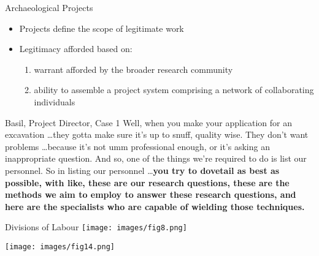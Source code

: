 \documentclass{beamer}
\begin{document}
\begin{frame}{Archaeological Projects}
  \begin{itemize}
    \item Projects define the scope of legitimate work
    \item Legitimacy afforded based on:
    \begin{enumerate}
      \item warrant afforded by the broader research community
      \item ability to assemble a project system comprising a network of collaborating individuals
    \end{enumerate}
  \end{itemize}

\begin{block}{Basil, Project Director, Case 1}
Well, when you make your application for an excavation \dots they gotta make sure it’s up to snuff, quality wise. They don’t want problems \dots because it’s not umm professional enough, or it’s asking an inappropriate question. And so, one of the things we’re required to do is list our personnel. So in listing our personnel \dots \textbf{you try to dovetail as best as possible, with like, these are our research questions, these are the methods we aim to employ to answer these research questions, and here are the specialists who are capable of wielding those techniques.}
\end{block}

\end{frame}


\begin{frame}{Divisions of Labour}
      \centering
      \texttt{[image: images/fig8.png]}

    \texttt{[image: images/fig14.png]}


\end{frame}
\end{document}
